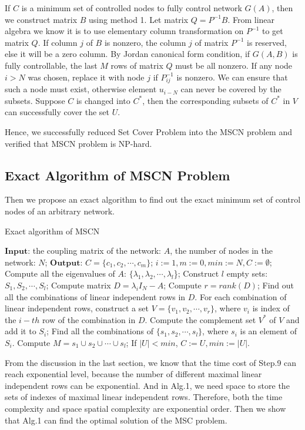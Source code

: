 \documentclass[10pt, conference, letterpaper]{IEEEtran}
\begin{document}
If $C$ is a minimum set of controlled nodes to fully control network $G(A)$, then we construct matrix $B$ using method 1. Let matrix $Q=P^{-1}B$. From linear algebra we know it is to use elementary column transformation on $P^{-1}$ to get matrix $Q$. If column $j$ of $B$ is nonzero, the column $j$ of matrix $P^{-1}$ is reserved, else it will be a zero column. By Jordan canonical form condition, if $G(A,B)$ is fully controllable, the last $M$ rows of matrix $Q$ must be all nonzero. If any node $i > N$ was chosen, replace it with node $j$ if $P^{-1}_{ij}$ is nonzero. We can ensure that such a node must exist, otherwise element $u_{i-N}$ can never be covered by the subsets. Suppose $C$ is changed into $C^*$, then the corresponding subsets of $C^*$ in $V$ can successfully cover the set $U$.

Hence, we successfully reduced Set Cover Problem into the MSCN problem and verified that MSCN problem is NP-hard.
\subsection{Exact Algorithm of MSCN Problem}
Then we propose an exact algorithm to find out the exact minimum set of control nodes of an arbitrary network.

\begin{algorithm}
\caption{Exact algorithm of MSCN}
\label{alg1}
\begin{algorithmic}[1]
\STATE $\textbf{Input:}$ the coupling matrix of the network: $A$, the number of nodes in the network: $N$;
\STATE $\textbf{Output:}$ $C = \{c_1,c_2,\cdots,c_m\}$;
\STATE $i :=1, m :=0, min :=N, C :=\emptyset$;
\STATE Compute all the eigenvalues of $A$: $\{\lambda_1,\lambda_2,\cdots,\lambda_l$\};
\STATE Construct $l$ empty sets: $S_1,S_2,\cdots,S_l$;
    \STATE  Compute matrix $D = \lambda_iI_N - A$;
    \STATE  Compute $r = rank(D)$;
    \STATE  Find out all the combinations of linear independent rows in $D$. For each combination of linear independent rows, construct a set $V = \{v_1,v_2,\cdots,v_r\}$, where $v_i$ is index of the $i-th$ row of the combination in $D$. Compute the complement set $V^*$ of $V$ and add it to $S_i$;
\ENDWHILE
\STATE Find all the combinations of $\{s_1,s_2,\cdots,s_l\}$, where $s_i$ is an element of $S_i$. Compute $M = s_1 \cup s_2 \cup \cdots \cup s_l$; If $|U| < min$, $C :=U, min :=|U|$.
\end{algorithmic}
\end{algorithm}

From the discussion in the last section, we know that the time cost of Step.9 can reach exponential level, because the number of different maximal linear independent rows can be exponential. And in Alg.1, we need space to store the sets of indexes of maximal linear independent rows. Therefore, both the time complexity and space spatial complexity are exponential order. Then we show that Alg.1 can find the optimal solution of the MSC problem.
\end{document}
